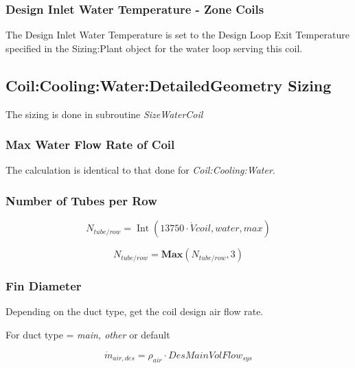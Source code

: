 \subsubsection{Design Inlet Water Temperature - Zone Coils}\label{design-inlet-water-temperature---zone-coils}

The Design Inlet Water Temperature is set to the Design Loop Exit Temperature specified in the Sizing:Plant object for the water loop serving this coil.

\subsection{Coil:Cooling:Water:DetailedGeometry Sizing}\label{coilcoolingwaterdetailedgeometry-sizing}

The sizing is done in subroutine \emph{SizeWaterCoil}

\subsubsection{Max Water Flow Rate of Coil}\label{max-water-flow-rate-of-coil}

The calculation is identical to that done for \emph{Coil:Cooling:Water}.

\subsubsection{Number of Tubes per Row}\label{number-of-tubes-per-row}

\begin{equation}
N_{tube/row} = \operatorname{Int} ({\mathrm{13750}}\cdot \dot Vcoil,water,max)
\end{equation}

\begin{equation}
N_{tube/row} = \textbf{Max}(N_{tube/row},3)
\end{equation}

\subsubsection{Fin Diameter}\label{fin-diameter}

Depending on the duct type, get the coil design air flow rate.

For duct type = \emph{main, other} or default

\begin{equation}
\dot m_{air,des} = \rho_{air}\cdot DesMainVolFlow_{sys}
\end{equation}

